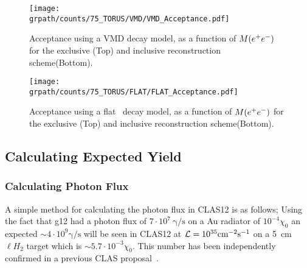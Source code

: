 \begin{figure}[h!]\begin{center}
		\texttt{[image: \\grpath/counts/75\_TORUS/VMD/VMD\_Acceptance.pdf]}
		\caption[Acceptance, as a function of $M(\epem)$]{\label{fig:VMDaccepted}{Acceptance using a VMD decay model, as a function of $M(\epem)$ for the exclusive (Top) and inclusive reconstruction scheme(Bottom). }}
\end{center}\end{figure}

 \begin{figure}[h!]\begin{center}
 		\texttt{[image: \\grpath/counts/75\_TORUS/FLAT/FLAT\_Acceptance.pdf]}
 		\caption[Acceptance, as a function of $M(\epem)$]{\label{fig:FLATaccepted}{Acceptance using a flat \epemT \ decay model, as a function of $M(\epem)$ for the exclusive (Top) and inclusive reconstruction scheme(Bottom).}}
 \end{center}\end{figure} 
\FloatBarrier
\subsection{Calculating Expected Yield}
\subsubsection{Calculating Photon Flux}\label{sec:calflux}
A simple method for calculating the photon flux in CLAS12 is as follows; Using the fact that g12 had a photon flux of $7\cdot 10^7 \ \mathrm{\gamma/s}$ on a Au radiator of $10^{-4} \chi_0$ an expected $\sim 4\cdot 10^9  \mathrm{\gamma/s}$ will be seen in CLAS12 at ${\cal L} = 10^{35}\mathrm{cm^{-2}s^{-1}}$ on a 5~cm $\ell H_2$ target which is $\sim 5.7\cdot 10^{-3} \chi_0$. This number has been independently confirmed in a previous CLAS proposal~\cite{clas.proposal.meson}.
